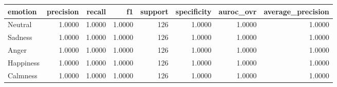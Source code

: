 \begin{tabular}{lrrrrrrr}
\toprule
emotion & precision & recall & f1 & support & specificity & auroc_ovr & average_precision \\
\midrule
Neutral & 1.0000 & 1.0000 & 1.0000 & 126 & 1.0000 & 1.0000 & 1.0000 \\
Sadness & 1.0000 & 1.0000 & 1.0000 & 126 & 1.0000 & 1.0000 & 1.0000 \\
Anger & 1.0000 & 1.0000 & 1.0000 & 126 & 1.0000 & 1.0000 & 1.0000 \\
Happiness & 1.0000 & 1.0000 & 1.0000 & 126 & 1.0000 & 1.0000 & 1.0000 \\
Calmness & 1.0000 & 1.0000 & 1.0000 & 126 & 1.0000 & 1.0000 & 1.0000 \\
\bottomrule
\end{tabular}
